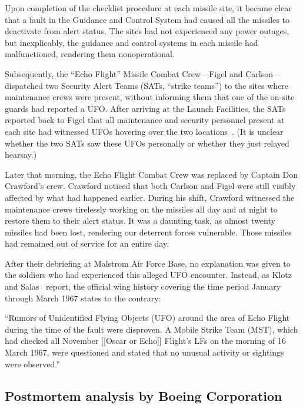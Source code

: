 Upon completion of the checklist procedure at each missile site,
it became clear that a fault in the Guidance and Control  System had caused all the missiles to deactivate from alert status.
The sites had not experienced any power outages, but inexplicably,
the guidance and control systems in each missile had malfunctioned, rendering them nonoperational.

Subsequently, the ``Echo Flight'' Missile Combat Crew---Figel and Carlson---dispatched two Security Alert Teams (SATs, ``strike teams'')
to the sites where maintenance crews were present, without informing them that one of the on-site guards had reported a UFO.
After arriving at the Launch Facilities, the SATs reported back to Figel
that all maintenance and security personnel present at each site had witnessed UFOs hovering over the two locations~\cite[p.~12]{Klotz2005Feb}.
(It is unclear whether the two SATs saw these UFOs personally or whether they just relayed hearsay.)

Later that morning, the Echo Flight Combat Crew was replaced by Captain Don Crawford's crew. Crawford noticed that both Carlson and Figel were still visibly affected by what had happened earlier. During his shift, Crawford witnessed the maintenance crews tirelessly working on the missiles all day and at night to restore them to their alert status. It was a daunting task, as almost twenty missiles had been lost, rendering our deterrent forces vulnerable.
Those missiles had remained out of service for an entire day.



After their debriefing at Malstrom Air Force Base, no explanation was given to the soldiers who had experienced this alleged UFO encounter.
Instead, as Klotz and Salas~\cite[p.~18]{Klotz2005Feb} report, the
official wing history covering the time period January through March 1967 states to the contrary:
\begin{svgraybox}
``Rumors of Unidentified Flying Objects (UFO) around the area of
Echo Flight during the time of the fault were disproven. A Mobile
Strike Team (MST), which had checked all November [[Oscar or Echo]] Flight's LFs on
the morning of 16 March 1967, were questioned and stated that no
unusual activity or sightings were observed.''
\end{svgraybox}

\subsection{Postmortem analysis by Boeing Corporation}

